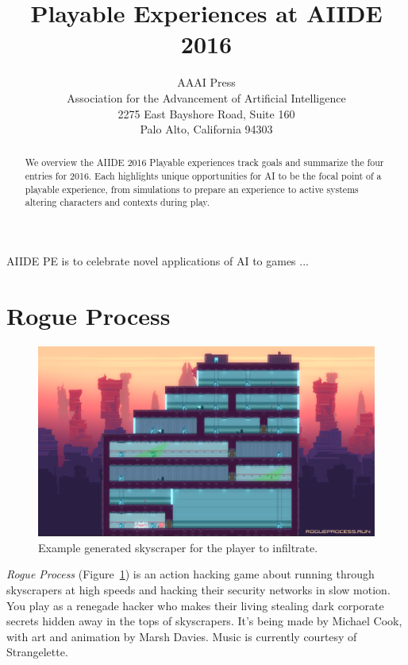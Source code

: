 \documentclass[letterpaper]{article}
\begin{document}
\title{Playable Experiences at AIIDE 2016}
\author{AAAI Press\\
Association for the Advancement of Artificial Intelligence\\
2275 East Bayshore Road, Suite 160\\
Palo Alto, California 94303\\
}
\maketitle
\begin{abstract}
We overview the AIIDE 2016 Playable experiences track goals and summarize the four entries for 2016.
Each highlights unique opportunities for AI to be the focal point of a playable experience, from simulations to prepare an experience to active systems altering characters and contexts during play.
\end{abstract}

\noindent AIIDE PE is to celebrate novel applications of AI to games
...

\section{Rogue Process}

\begin{figure}[tbh]
  \centering
  \includegraphics[width=\columnwidth]{images/rogue_process-screen}
  \caption{Example generated skyscraper for the player to infiltrate.}
  \label{fig:rp-setting}
\end{figure}


\textit{Rogue Process} (Figure~\ref{fig:rp-setting}) is an action hacking game about running through skyscrapers at high speeds and hacking their security networks in slow motion.
You play as a renegade hacker who makes their living stealing dark corporate secrets hidden away in the tops of skyscrapers.
It's being made by Michael Cook, with art and animation by Marsh Davies.
Music is currently courtesy of Strangelette.
\end{document}
